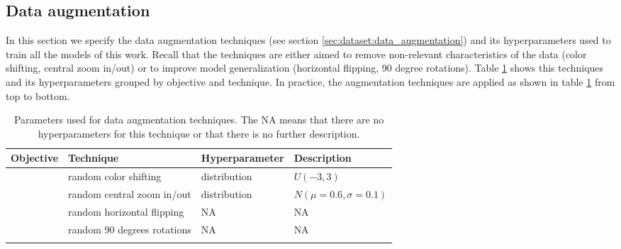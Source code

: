 \subsection{Data augmentation}
\label{sec:methodology:data:augm}

In this section we specify the data augmentation techniques (see section \ref{sec:dataset:data_augmentation}) and its hyperparameters used to train all the models of this work. Recall that the techniques are either aimed to remove non-relevant characteristics of the data (color shifting, central zoom in/out) or to improve model generalization (horizontal flipping, 90 degree rotations). Table \ref{table:methodology:dataset:augm} shows this techniques and its hyperparameters grouped by objective and technique. In practice, the augmentation techniques are applied as shown in table \ref{table:methodology:dataset:augm} from top to bottom.

\setlength{\mylinewidth}{\linewidth-7pt}%
\setlength{\mylengtha}{0.2\mylinewidth-2\arraycolsep}%
\setlength{\mylengthb}{0.2\mylinewidth-2\arraycolsep}%
\setlength{\mylengthc}{0.25\mylinewidth-2\arraycolsep}%
\setlength{\mylengthd}{0.22\mylinewidth-2\arraycolsep}%

\begin{longtable}{>{\centering\arraybackslash}m{\mylengtha} | >{\centering\arraybackslash}m{\mylengthb} | >{\centering\arraybackslash}m{\mylengthc} | >{\centering\arraybackslash}m{\mylengthd}}
    \hline
    Objective & Technique & Hyperparameter & Description \\
    \hline
    \multirow{2}{\mylengtha}{\centering Remove non-relevant features} & random color shifting & distribution & $U(-3,3)$ \\
    \cline{2-4}
     & random central zoom in/out & distribution\footnotemark & $N(\mu=0.6, \sigma=0.1)$ \\
    \hline
     \multirow{2}{\mylengtha}{\centering Improve generalization} & random horizontal flipping & NA & NA \\
    \cline{2-4}
     & random 90 degrees rotations & NA & NA \\
    \hline
  \caption{Parameters used for data augmentation techniques. The NA means that there are no hyperparameters for this technique or that there is no further description.}
  \label{table:methodology:dataset:augm}
\end{longtable}


